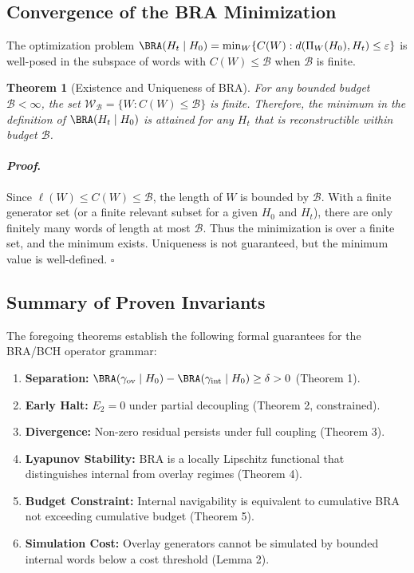\documentclass[12pt]{article}
\theoremstyle{plain}
\newtheorem{theorem}{Theorem}[section]
\theoremstyle{definition}
\theoremstyle{remark}
\renewenvironment{proof}{\paragraph{\textit{Proof}.}}{\hfill$\square$}
\begin{document}
\subsection{Convergence of the BRA Minimization}

The optimization problem $\BRA(H_t \mid H_0) = \min_W \{C(W) : d(\Pi_W(H_0), H_t) \le \varepsilon\}$ is well-posed in the subspace of words with $C(W) \le \mathcal{B}$ when $\mathcal{B}$ is finite.

\begin{theorem}[Existence and Uniqueness of BRA]
\statusthm
For any bounded budget $\mathcal{B} < \infty$, the set $\mathcal{W}_{\mathcal{B}} = \{W : C(W) \le \mathcal{B}\}$ is finite. Therefore, the minimum in the definition of $\BRA(H_t \mid H_0)$ is attained for any $H_t$ that is reconstructible within budget $\mathcal{B}$.
\end{theorem}

\begin{proof}
Since $\ell(W) \le C(W) \le \mathcal{B}$, the length of $W$ is bounded by $\mathcal{B}$. With a finite generator set (or a finite relevant subset for a given $H_0$ and $H_t$), there are only finitely many words of length at most $\mathcal{B}$. Thus the minimization is over a finite set, and the minimum exists. Uniqueness is not guaranteed, but the minimum value is well-defined.
\end{proof}

\subsection{Summary of Proven Invariants}

The foregoing theorems establish the following formal guarantees for the BRA/BCH operator grammar:

\begin{enumerate}
\item \textbf{Separation:} $\BRA(\gamma_{\text{ov}} \mid H_0) - \BRA(\gamma_{\text{int}} \mid H_0) \ge \delta > 0$ (Theorem 1).
\item \textbf{Early Halt:} $E_2 = 0$ under partial decoupling (Theorem 2, constrained).
\item \textbf{Divergence:} Non-zero residual persists under full coupling (Theorem 3).
\item \textbf{Lyapunov Stability:} BRA is a locally Lipschitz functional that distinguishes internal from overlay regimes (Theorem 4).
\item \textbf{Budget Constraint:} Internal navigability is equivalent to cumulative BRA not exceeding cumulative budget (Theorem 5).
\item \textbf{Simulation Cost:} Overlay generators cannot be simulated by bounded internal words below a cost threshold (Lemma 2).
\end{enumerate}
\end{document}
